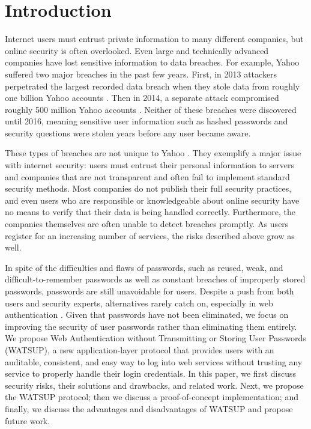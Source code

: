 \section{Introduction}
\label{sec:intro}

Internet users must entrust private information to many different companies, but online security is often overlooked. Even large and technically advanced companies have lost sensitive information to data breaches. For example, Yahoo suffered two major breaches in the past few years. First, in 2013 attackers perpetrated the largest recorded data breach when they stole data from roughly one billion Yahoo accounts \cite{Thielman:2016}. Then in 2014, a separate attack compromised roughly 500 million Yahoo accounts \cite{Fiegerman:2016}. Neither of these breaches were discovered until 2016, meaning sensitive user information such as hashed passwords and security questions were stolen years before any user became aware.

These types of breaches are not unique to Yahoo \cite{Hunt:2016, Tabachnik:2016}. They exemplify a major issue with internet security: users must entrust their personal information to servers and companies that are not transparent and often fail to implement standard security methods. Most companies do not publish their full security practices, and even users who are responsible or knowledgeable about online security have no means to verify that their data is being handled correctly. Furthermore, the companies themselves are often unable to detect breaches promptly. As users register for an increasing number of services, the risks described above grow as well.

In spite of the difficulties and flaws of passwords, such as reused, weak, and difficult-to-remember passwords as well as constant breaches of improperly stored passwords, passwords are still unavoidable for users. Despite a push from both users and security experts, alternatives rarely catch on, especially in web authentication \cite{Herley:2011}. Given that passwords have not been eliminated, we focus on improving the security of user passwords rather than eliminating them entirely.
We propose Web Authentication without Transmitting or Storing User Passwords (WATSUP), a new application-layer protocol that provides users with an auditable, consistent, and easy way to log into web services without trusting any service to properly handle their login credentials. In this paper, we first discuss security risks, their solutions and drawbacks, and related work. Next, we propose the WATSUP protocol; then we discuss a proof-of-concept implementation; and finally, we discuss the advantages and disadvantages of WATSUP and propose future work.
